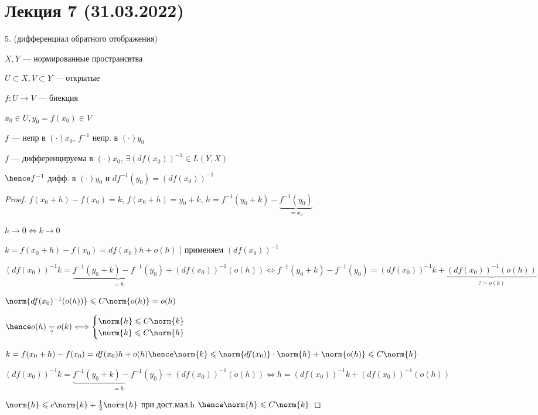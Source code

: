 \section*{Лекция 7 (31.03.2022)}

5. (дифференциал обратного отображения)


$X, Y$ --- нормированные пространсвтва

$U \subset X, V \subset Y$ --- открытые

$f: U \to V$ --- биекция

$x_0 \in U, y_0 = f(x_0) \in V$

$f $ --- непр в $(\cdot) x_0$, $f^{-1}$ непр. в $(\cdot) y_0$

$f$ --- дифференцируема в $(\cdot)x_0$, $\exists (df(x_0))^{-1} \in L(Y, X)$

$\hence f^{-1}$ дифф. в $(\cdot) y_0$ и $df^{-1}(y_0) = (df(x_0))^{-1}$


\begin{proof}
    $f(x_0 + h) - f(x_0) = k$, $f(x_0 + h) = y_0 + k$, $h = f^{-1}(y_0 + k) - \underbrace{f^{-1}(y_0)}_{=x_0}$

    $h \to 0 \Longleftrightarrow k \to 0$

    $k = f(x_0 + h) - f(x_0) = df(x_0)h + o(h)$ | применяем $(df(x_0))^{-1}$

    $(df(x_0))^{-1} k = \underbrace{f^{-1}(y_0 + k) - f^{-1}(y_0)}_{=h} + (df(x_0))^{-1}(o(h)) \Longleftrightarrow f^{-1}(y_0 + k) - f^{-1}(y_0) = (df(x_0)) ^ {-1} k + \underbrace{(df(x_0))^{-1}(o(h))}_{?= o(k)}$

    $\norm{df(x_0)^{-1}(o(h))} \leqslant C \norm{o(h)} = o(h)$

    $\hence o(h) \underset{?}{=} o(k) \Longleftrightarrow \begin{cases}
        \norm{h} \leqslant C \norm{k} \\
        \norm{k} \leqslant C\norm{h}
    \end{cases}$

    $k = f(x_0 + h) - f(x_0) = df(x_0)h + o(h) \hence \norm{k} \leqslant \norm{df(x_0)} \cdot \norm{h} + \norm{o(h)} \leqslant C \norm{h}$

    $(df(x_0))^{-1} k = \underbrace{f^{-1}(y_0 + k) - f^{-1}(y_0)}_{=h} + (df(x_0))^{-1}(o(h)) \Longleftrightarrow h = (df(x_0))^{-1}k + (df(x_0))^{-1}(o(h))$

    $\norm{h} \leqslant c \norm{k} + \frac{1}{2}\norm{h}$ при дост.мал.h $\hence \norm{h} \leqslant C \norm{k}$
\end{proof}
\newpage

